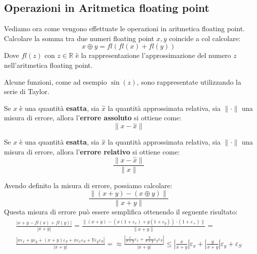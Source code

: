 \subsection{Operazioni in Aritmetica floating point}
Vediamo ora come vengono effettuate le operazioni in aritmetica floating point.
Calcolare la somma tra due numeri floating point $x,y$ coincide a col calcolare:
\begin{equation}
    x \oplus y = fl(fl(x) + fl(y))
\end{equation}
Dove $fl(z)$ con $z\in \mathbb{R}$ è la rappresentazione l'approssimazione del
numero $z$ nell'aritmetica floating point.
\begin{nota}
    Alcune funzioni, come ad esempio $\sin(z)$, sono rappresentate utilizzando
    la serie di Taylor.
\end{nota}
\begin{definizione} 
    Se $x$ è una quantità \textbf{esatta}, sia $\stackrel{\sim}{x}$ la quantità
    approssimata relativa, sia $\|\cdot\|$ una misura di errore, allora
    l'\textbf{errore assoluto} si ottiene come:
    \begin{equation}
        \|x-\stackrel{\sim}{x}\|
    \end{equation}
\end{definizione}
\begin{definizione} 
    Se $x$ è una quantità \textbf{esatta}, sia $\stackrel{\sim}{x}$ la quantità
    approssimata relativa, sia $\|\cdot\|$ una misura di errore, allora
    l'\textbf{errore relativo} si ottiene come:
    \begin{equation}
        \frac{\|x-\stackrel{\sim}{x}\|}{\|x\|}
    \end{equation}
\end{definizione}
Avendo definito la misura di errore, possiamo calcolare:
\begin{equation}
    \frac{\|(x+y)-(x\oplus y)\|}{\|x+y\|}
\end{equation}
Questa misura di errore può essere semplifica ottenendo il seguente risultato:
\begin{equation}
    \begin{aligned}
        \frac{|x + y - fl(x) + fl(y)|}{|x + y|} = \frac{\|(x + y) - (x (1 +
        \varepsilon_x) + y(1 + \varepsilon_y)) \cdot (1 + \varepsilon_+)\|}{\|x + y\|} = \\
        \frac{|x \varepsilon_x + y \varepsilon_y + (x + y) \varepsilon_S + x
            \varepsilon_x \varepsilon_S + Y \varepsilon_y \varepsilon_S|}{|x + y|} =
        \approx \frac{\left|\frac{x}{x + y} \varepsilon_x + \frac{y}{x + y}
            \varepsilon_y \varepsilon_S \right|}{|x + y|} \leq \left|\frac{x}{x + y}
        \right| \varepsilon_x + \left|\frac{y}{x + y}\right| \varepsilon_y + \varepsilon_S
    \end{aligned}
\end{equation}
